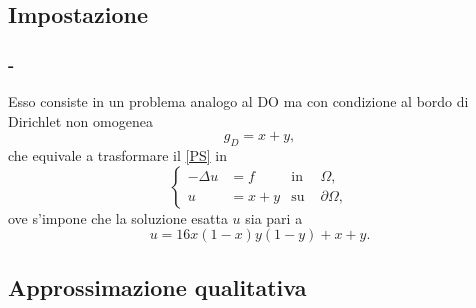 \documentclass[11pt]{beamer}
\newcommand{\teqref}[2]{\hyperref[#1]{#2}}
\begin{document}
            \subsection{Impostazione}
        
                \begin{frame}\frametitle{\titoloSez{} - \insertsubsection{}}
                    Esso consiste in un problema analogo al DO ma con condizione al bordo di Dirichlet non omogenea
                    \begin{equation*}
                        g_D=x+y,
                    \end{equation*}
                    che equivale a trasformare il \teqref{eqProblemaStazionario}{[PS]} in
                    \begin{equation*}
                        \left\{
                        \begin{aligned}
                            -\Delta u&=f&\text{in }&\Omega,\\
                                    u&=x+y&\text{su }&\partial\Omega,
                        \end{aligned}
                        \right.
                        \label{eqDNO}
                    \end{equation*}
                    ove s'impone che la soluzione esatta $u$ sia pari a
                    \begin{equation*}
                        u=16x(1-x)y(1-y)+x+y.
                        \label{eqSoluzioneEsattaDNO}
                    \end{equation*}
                \end{frame}

            \subsection{Approssimazione qualitativa}
            
\end{document}
